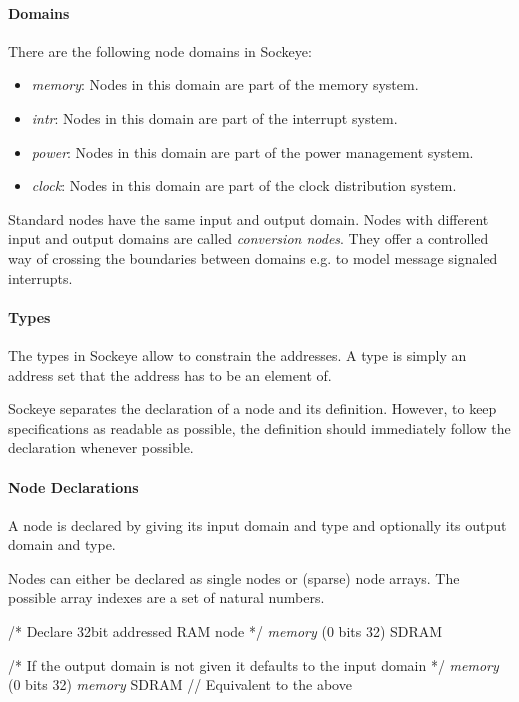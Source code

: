 \documentclass[a4paper,11pt,twoside]{report}
\begin{document}
{{{\paragraph{Domains}
There are the following node domains in Sockeye:
\begin{itemize}
  \item \textit{memory}: Nodes in this domain are part of the memory system. 
  \item \textit{intr}: Nodes in this domain are part of the interrupt system.
  \item \textit{power}: Nodes in this domain are part of the power management system.
  \item \textit{clock}: Nodes in this domain are part of the clock distribution system.
\end{itemize}
Standard nodes have the same input and output domain.
Nodes with different input and output domains are called \emph{conversion nodes}.
They offer a controlled way of crossing the boundaries between domains e.g. to model message signaled interrupts.

\paragraph{Types} The types in Sockeye allow to constrain the addresses.
A type is simply an address set that the address has to be an element of.

Sockeye separates the declaration of a node and its definition.
However, to keep specifications as readable as possible, the definition should immediately follow the declaration whenever possible.

\paragraph{Node Declarations} A node is declared by giving its input domain and type and optionally its output domain and type.

Nodes can either be declared as single nodes or (sparse) node arrays.
The possible array indexes are a set of natural numbers.
\begin{example}
  /* Declare 32bit addressed RAM node */
  \textit{memory} (0 bits 32) SDRAM

  /* If the output domain is not given it defaults to the input domain */
  \textit{memory} (0 bits 32) \textit{memory} SDRAM // Equivalent to the above


\end{example}}}}
\end{document}
